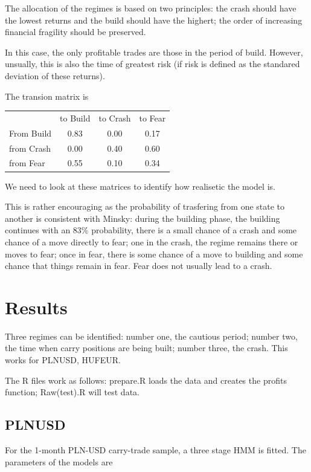 \documentclass[12pt, a4paper, oneside]{article} %
\begin{document}
  
The allocation of the regimes is based on two principles:  the crash should have the lowest returns and the build should have the highert; the order of increasing financial fragility should be preserved.  

In this case, the only profitable trades are those in the period of build.  However, unsually, this is also the time of greatest risk (if risk is defined as the standared deviation of these returns).  

The transion matrix is 

 \begin{centering}
 \begin{tabular}{l c c c}
 & to Build & to Crash & to Fear\\
 From Build & 0.83 & 0.00 & 0.17\\
 from Crash & 0.00 & 0.40 & 0.60\\
 from Fear & 0.55 & 0.10 & 0.34
 \end{tabular}
 \end{centering}
 
We need to look at these matrices to identify how realisetic the model is. 

This is rather encouraging as the probability of trasfering from one state to another is consistent with Minsky:  during the building phase, the building continues with an 83\% probability, there is a small chance of a crash and some chance of a move directly to fear; one in the crash, the regime remains there or moves to fear; once in fear, there is some chance of a move to building and some chance that things remain in fear.  Fear does not usually lead to a crash. 


\section{Results}
Three regimes can be identified: number one, the cautious period; number two, the time when carry positions are being built; number three, the crash.  This works for PLNUSD, HUFEUR. 

The R files work as follows: prepare.R loads the data and creates the profits function; Raw(test).R will test data. 

\subsection{PLNUSD}
For the 1-month PLN-USD carry-trade sample, a three stage HMM is fitted.  The parameters of the models are 
\end{document}
